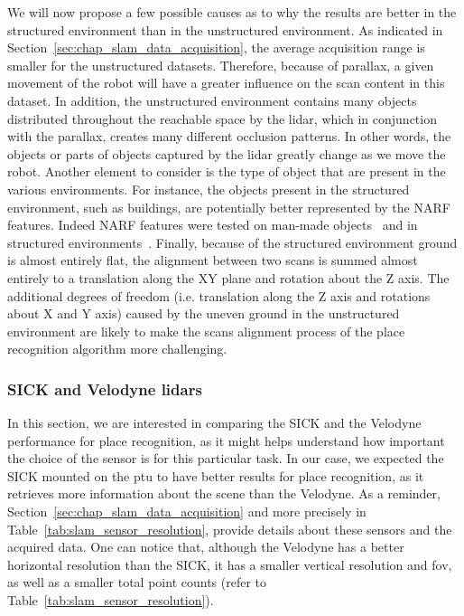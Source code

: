 We will now propose a few possible causes as to why the results are better in the structured environment than in the unstructured environment. As indicated in Section~\ref{sec:chap_slam_data_acquisition}, the average acquisition range is smaller for the unstructured datasets. Therefore, because of parallax, a given movement of the robot will have a greater influence on the scan content in this dataset. In addition, the unstructured environment contains many objects distributed throughout the reachable space by the \gls*{lidar}, which in conjunction with the parallax, creates many different occlusion patterns. In other words, the objects or parts of objects captured by the \gls*{lidar} greatly change as we move the robot. Another element to consider is the type of object that are present in the various environments. For instance, the objects present in the structured environment, such as buildings, are potentially better represented by the NARF features. Indeed NARF features were tested on man-made objects~\cite{Steder2011a} and in structured environments~\cite{Steder2010, Steder2011b}. Finally, because of the structured environment ground is almost entirely flat, the alignment between two scans is summed almost entirely to a translation along the XY plane and rotation about the Z axis. The additional degrees of freedom (i.e. translation along the Z axis and rotations about X and Y axis) caused by the uneven ground in the unstructured environment are likely to make the scans alignment process of the place recognition algorithm more challenging. 


\subsubsection{SICK and Velodyne \gls*{lidar}s}
\label{ssec:chap_slam_sick_vs_velodyne}

In this section, we are interested in comparing the SICK and the Velodyne performance for place recognition, as it might helps understand how important the choice of the sensor is for this particular task. In our case, we expected the SICK mounted on the \gls*{ptu} to have better results for place recognition, as it retrieves more information about the scene than the Velodyne. As a reminder, Section~\ref{sec:chap_slam_data_acquisition} and more precisely in Table~\ref{tab:slam_sensor_resolution}, provide details about these sensors and the acquired data. One can notice that, although the Velodyne has a better horizontal resolution than the SICK, it has a smaller vertical resolution and \gls*{fov}, as well as a smaller total point counts (refer to Table~\ref{tab:slam_sensor_resolution}). 

